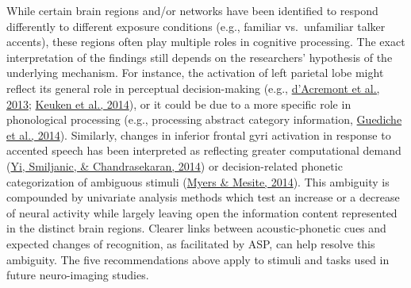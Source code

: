 \documentclass[
  11pt,
  english,
  man,floatsintext]{apa6}
\begin{document}
While certain brain regions and/or networks have been identified to respond differently to different exposure conditions (e.g., familiar vs.~unfamiliar talker accents), these regions often play multiple roles in cognitive processing. The exact interpretation of the findings still depends on the researchers' hypothesis of the underlying mechanism. For instance, the activation of left parietal lobe might reflect its general role in perceptual decision-making (e.g., \protect\hyperlink{ref-dacremont2013}{d'Acremont et al., 2013}; \protect\hyperlink{ref-keuken2014}{Keuken et al., 2014}), or it could be due to a more specific role in phonological processing (e.g., processing abstract category information, \protect\hyperlink{ref-guediche2014}{Guediche et al., 2014}). Similarly, changes in inferior frontal gyri activation in response to accented speech has been interpreted as reflecting greater computational demand (\protect\hyperlink{ref-yi2014neural}{Yi, Smiljanic, \& Chandrasekaran, 2014}) or decision-related phonetic categorization of ambiguous stimuli (\protect\hyperlink{ref-myers-mesite2014}{Myers \& Mesite, 2014}). This ambiguity is compounded by univariate analysis methods which test an increase or a decrease of neural activity while largely leaving open the information content represented in the distinct brain regions. Clearer links between acoustic-phonetic cues and expected changes of recognition, as facilitated by ASP, can help resolve this ambiguity. The five recommendations above apply to stimuli and tasks used in future neuro-imaging studies.
\end{document}
